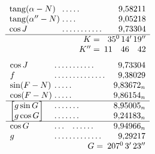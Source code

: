 \[
\begin{array}{l@{\;}l@{\;}r}
\operatorname{tang}(\alpha-N)&\mathord{.}\,\mathord{.}\,\mathord{.}\,\mathord{.}\,\mathord{.}&9{,}58211\\
\operatorname{tang}(\alpha''-N)&\mathord{.}\,\mathord{.}\,\mathord{.}\,\mathord{.}&9{,}05218\\
\cos J&\mathord{.}\,\mathord{.}\,\mathord{.}\,\mathord{.}\,\mathord{.}\,\mathord{.}\,\mathord{.}\,\mathord{.}\,\mathord{.}\,\mathord{.}\,\mathord{.}&9{,}73304\\\hline
\multicolumn{2}{r}{K=}&35^{0}\,14'\,19''\\
\multicolumn{2}{r}{K''=}&11\quad46\quad42
\end{array}
\]
\[
\begin{array}{l@{\;}l@{\;}r}
\cos J&\mathord{.}\,\mathord{.}\,\mathord{.}\,\mathord{.}\,\mathord{.}\,\mathord{.}\,\mathord{.}\,\mathord{.}\,\mathord{.}\,\mathord{.}\,\mathord{.}&9{,}73304\\
f&\mathord{.}\,\mathord{.}\,\mathord{.}\,\mathord{.}\,\mathord{.}\,\mathord{.}\,\mathord{.}\,\mathord{.}\,\mathord{.}\,\mathord{.}\,\mathord{.}\,\mathord{.}\,\mathord{.}\,\mathord{.}&9{,}38029\\
\sin(F-N)&\mathord{.}\,\mathord{.}\,\mathord{.}\,\mathord{.}\,\mathord{.}&9{,}83672_n\\
\cos(F-N)&\mathord{.}\,\mathord{.}\,\mathord{.}\,\mathord{.}\,\mathord{.}&9{,}86154_n\\\hline
\left[\begin{array}{@{}l@{}}g\sin G\\g\cos G\end{array}\right]&
\begin{array}{@{}l@{}}\mathord{.}\,\mathord{.}\,\mathord{.}\,\mathord{.}\,\mathord{.}\,\mathord{.}\,\mathord{.}\\\mathord{.}\,\mathord{.}\,\mathord{.}\,\mathord{.}\,\mathord{.}\,\mathord{.}\,\mathord{.}\end{array}&
\begin{array}{@{}r@{}}8{,}95005_n\\9{,}24183_n\end{array}\\\hline
\cos G&\mathord{.}\,\mathord{.}\,\mathord{.}\quad\mathord{.}\,\mathord{.}\,\mathord{.}\,\mathord{.}\,\mathord{.}\,\mathord{.}&9{,}94966_n\\
g&\mathord{.}\,\mathord{.}\,\mathord{.}\,\mathord{.}\,\mathord{.}\,\mathord{.}\,\mathord{.}\,\mathord{.}\,\mathord{.}\,\mathord{.}\,\mathord{.}\,\mathord{.}\,\mathord{.}&9{,}29217\\
\multicolumn{2}{r}{G=}&207^{0}\,3'\,23''
\end{array}
\]
